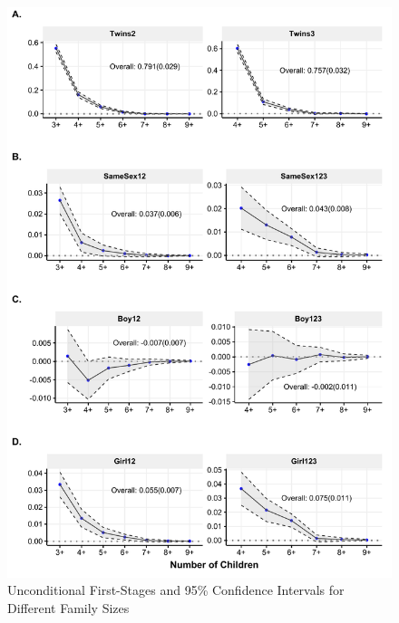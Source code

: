 \pagebreak

\begin{figure}[ht]
\centering
\caption{\label{fig:02}Unconditional First-Stages and 95\% Confidence Intervals for Different Family Sizes}
\includegraphics[width=\textwidth]{figures/acrs.pdf}
\end{figure}

